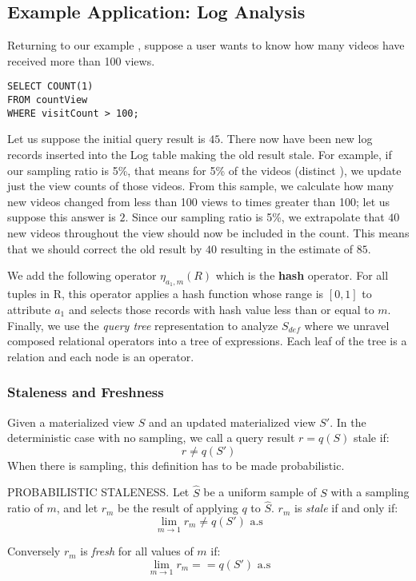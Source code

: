 \subsection{Example Application: Log Analysis}
Returning to our example , suppose a user wants to know how many videos have received more than 100 views.
\begin{lstlisting} 
SELECT COUNT(1)
FROM countView
WHERE visitCount > 100;
\end{lstlisting}
Let us suppose the initial query result is $45$.
There now have been new log records inserted into the Log table making the old result stale.
For example, if our sampling ratio is 5\%, that means for 5\% of the videos (distinct ), we update just the view counts of those videos.
From this sample, we calculate how many new videos changed from less than 100 views to times greater than 100; let us suppose this answer is $2$.
Since our sampling ratio is 5\%, we extrapolate that $40$ new videos throughout the view should now be included in the count.
This means that we should correct the old result by $40$ resulting in the estimate of $85$.

\iffalse
We add the following operator $\eta_{a_1, m}(R)$ which is the \textbf{hash} operator.
For all tuples in R, this operator applies a hash function whose range is $[0,1]$ to attribute $a_1$ and selects those records with hash value less than or equal to $m$.
Finally, we use the \emph{query tree} representation to analyze $S_{def}$ where we unravel composed relational operators into a tree of expressions.
Each leaf of the tree is a relation and each node is an operator.

\subsubsection{Staleness and Freshness}


Given a materialized view $S$ and an updated materialized view $S'$.
In the deterministic case with no sampling, we call a query result $r = q(S)$ stale if:
\[r \ne q(S')\]
When there is sampling, this definition has to be made probabilistic.



\begin{definition} PROBABILISTIC STALENESS.
Let $\hat{S}$ be a uniform sample of $S$ with a sampling ratio of $m$,
and let $r_m$ be the result of applying $q$ to $\hat{S}$.
$r_m$ is \emph{stale} if and only if:
\[\lim_{m\rightarrow 1} r_m \ne q(S') \text{  a.s}\]

Conversely $r_m$ is \emph{fresh} for all values of $m$ if:
\[\lim_{m\rightarrow 1} r_m == q(S') \text{  a.s}\]
\end{definition}


